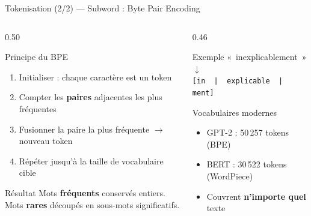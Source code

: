 \documentclass[aspectratio=169, 10pt]{beamer}
\begin{document}
\begin{frame}{Tokenisation (2/2) --- Subword : Byte Pair Encoding}
  \begin{columns}[T]
    \begin{column}{0.50\textwidth}
      \begin{block}{Principe du BPE}
        \begin{enumerate}
          \item Initialiser : chaque caractère est un token
          \item Compter les \textbf{paires} adjacentes les plus fréquentes
          \item Fusionner la paire la plus fréquente $\to$ nouveau token
          \item Répéter jusqu'à la taille de vocabulaire cible
        \end{enumerate}
      \end{block}
      \smallskip
      \begin{block}{Résultat}
        Mots \textbf{fréquents} conservés entiers.\\
        Mots \textbf{rares} découpés en sous-mots significatifs.
      \end{block}
    \end{column}
    \begin{column}{0.46\textwidth}
      \begin{exampleblock}{Exemple}
        \centering
        \vspace{4pt}
        \small «~inexplicablement~»\\[6pt]
        $\downarrow$\\[4pt]
        \texttt{\small[in \,|\, explicable \,|\, ment]}
        \vspace{4pt}
      \end{exampleblock}
      \smallskip
      \begin{alertblock}{Vocabulaires modernes}
        \begin{itemize}
          \item GPT-2 : 50\,257 tokens (BPE)
          \item BERT : 30\,522 tokens (WordPiece)
          \item Couvrent \textbf{n'importe quel} texte
        \end{itemize}
      \end{alertblock}
    \end{column}
  \end{columns}
\end{frame}
\end{document}
